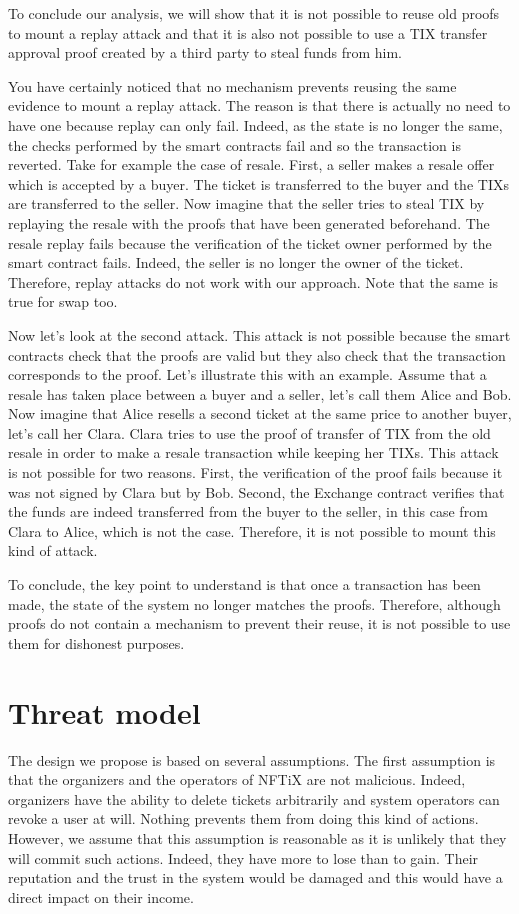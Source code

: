 \documentclass[a4paper,11pt,oneside]{report}
\begin{document}
To conclude our analysis, we will show that it is not possible to reuse old proofs to mount a replay attack and that it is also not possible to use a TIX transfer approval proof created by a third party to steal funds from him.

You have certainly noticed that no mechanism prevents reusing the same evidence to mount a replay attack. The reason is that there is actually no need to have one because replay can only fail. Indeed, as the state is no longer the same, the checks performed by the smart contracts fail and so the transaction is reverted. Take for example the case of resale. First, a seller makes a resale offer which is accepted by a buyer. The ticket is transferred to the buyer and the TIXs are transferred to the seller. Now imagine that the seller tries to steal TIX by replaying the resale with the proofs that have been generated beforehand. The resale replay fails because the verification of the ticket owner performed by the smart contract fails. Indeed, the seller is no longer the owner of the ticket. Therefore, replay attacks do not work with our approach. Note that the same is true for swap too.

Now let's look at the second attack. This attack is not possible because the smart contracts check that the proofs are valid but they also check that the transaction corresponds to the proof. Let's illustrate this with an example. Assume that a resale has taken place between a buyer and a seller, let's call them Alice and Bob. Now imagine that Alice resells a second ticket at the same price to another buyer, let's call her Clara. Clara tries to use the proof of transfer of TIX from the old resale in order to make a resale transaction while keeping her TIXs. This attack is not possible for two reasons. First, the verification of the proof fails because it was not signed by Clara but by Bob. Second, the Exchange contract verifies that the funds are indeed transferred from the buyer to the seller, in this case from Clara to Alice, which is not the case. Therefore, it is not possible to mount this kind of attack.

To conclude, the key point to understand is that once a transaction has been made, the state of the system no longer matches the proofs. Therefore, although proofs do not contain a mechanism to prevent their reuse, it is not possible to use them for dishonest purposes.

\section{Threat model}
The design we propose is based on several assumptions. The first assumption is that the organizers and the operators of NFTiX are not malicious. Indeed, organizers have the ability to delete tickets arbitrarily and system operators can revoke a user at will. Nothing prevents them from doing this kind of actions. However, we assume that this assumption is reasonable as it is unlikely that they will commit such actions. Indeed, they have more to lose than to gain. Their reputation and the trust in the system would be damaged and this would have a direct impact on their income.
\end{document}

